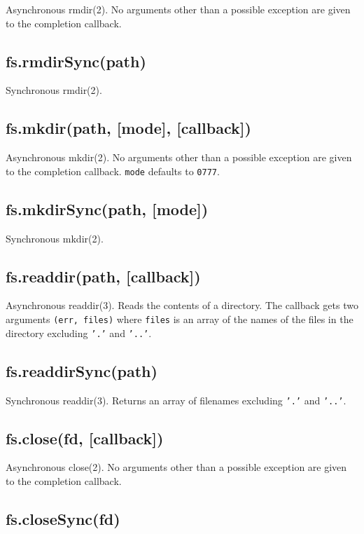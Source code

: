 Asynchronous rmdir(2). No arguments other than a possible exception are
given to the completion callback.

\subsection{fs.rmdirSync(path)}

Synchronous rmdir(2).

\subsection{fs.mkdir(path, {[}mode{]}, {[}callback{]})}

Asynchronous mkdir(2). No arguments other than a possible exception are
given to the completion callback. \texttt{mode} defaults to
\texttt{0777}.

\subsection{fs.mkdirSync(path, {[}mode{]})}

Synchronous mkdir(2).

\subsection{fs.readdir(path, {[}callback{]})}

Asynchronous readdir(3). Reads the contents of a directory. The callback
gets two arguments \texttt{(err, files)} where \texttt{files} is an
array of the names of the files in the directory excluding \texttt{'.'}
and \texttt{'..'}.

\subsection{fs.readdirSync(path)}

Synchronous readdir(3). Returns an array of filenames excluding
\texttt{'.'} and \texttt{'..'}.

\subsection{fs.close(fd, {[}callback{]})}

Asynchronous close(2). No arguments other than a possible exception are
given to the completion callback.

\subsection{fs.closeSync(fd)}

